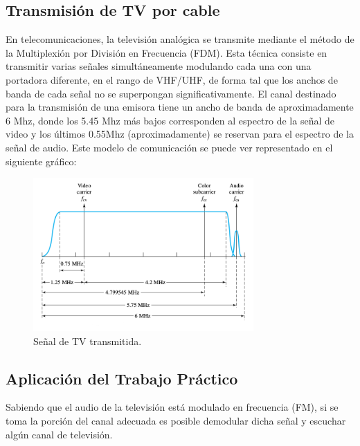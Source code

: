 \documentclass[10pt,a4paper]{article}
\begin{document}
\subsection{Transmisión de TV por cable}

En telecomunicaciones, la televisión analógica se transmite mediante
el método de la Multiplexión por División en Frecuencia (FDM). Esta
técnica consiste en transmitir varias señales simultáneamente modulando
cada una con una portadora diferente, en el rango de VHF/UHF, de forma
tal que los anchos de banda de cada señal no se superpongan significativamente.
El canal destinado para la transmisión de una emisora tiene un ancho
de banda de aproximadamente 6 Mhz, donde los 5.45 Mhz más bajos corresponden
al espectro de la señal de video y los últimos 0.55Mhz (aproximadamente)
se reservan para el espectro de la señal de audio. Este modelo de
comunicación se puede ver representado en el siguiente gráfico:

\begin{figure}[H]
\begin{centering}
\includegraphics[width=0.75\textwidth]{Imagenes/TV_Spectrum.png}
\par\end{centering}

\caption{Señal de TV transmitida.}
\end{figure}



\subsection{Aplicación del Trabajo Práctico}

Sabiendo que el audio de la televisión está modulado en frecuencia
(FM), si se toma la porción del canal adecuada es posible demodular
dicha señal y escuchar algún canal de televisión.
\end{document}
